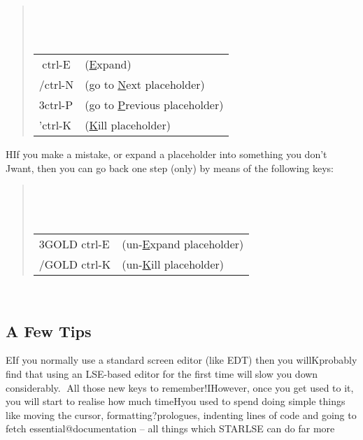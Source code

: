  \begin{quote}  \begin{center} \begin{tabular}{ll}  ctrl-E & (\underline{E}xpand)\\ / ctrl-N & (go to \underline{N}ext placeholder)\\ 3 ctrl-P & (go to \underline{P}revious placeholder)\\ ' ctrl-K & (\underline{K}ill placeholder) 
 \end{tabular}  \end{center} \end{quote}   H If you make a mistake, or expand a placeholder into something you don't J want, then you can go back one step (only) by means of the following keys:  
 \begin{quote}  \begin{center} \begin{tabular}{ll} 3 GOLD ctrl-E & (un-\underline{E}xpand placeholder)\\ / GOLD ctrl-K & (un-\underline{K}ill placeholder) 
 \end{tabular}  \end{center} \end{quote}      \subsection{A Few Tips}   E If you normally use a standard screen editor (like EDT) then you will K probably find that using an \mbox{LSE}-based editor for the first time will  slow you down considerably.  All those new keys to remember! I However, once you get used to it, you will start to realise how much time H you used to spend doing simple things like moving the cursor, formatting? prologues, indenting lines of code and going to fetch essential @ documentation -- all things which \mbox{STARLSE} can do far more
